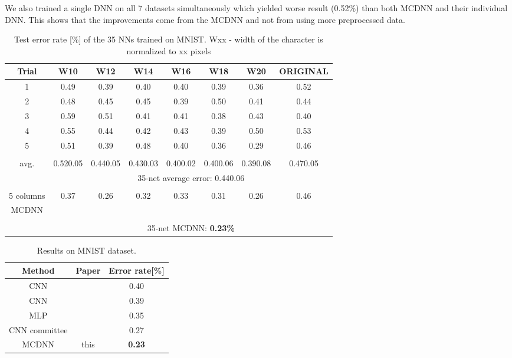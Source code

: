 \documentclass[a4paper]{article}
\begin{document}
We also trained a single DNN on all 7 datasets simultaneously which yielded worse result (0.52\%) than both MCDNN and their individual DNN. This shows that the improvements come from the MCDNN and not from using more preprocessed data.

\begin{table*}[ht!]
	\caption{Test error rate [\%] of the 35 NNs trained on MNIST. Wxx - width of the character is normalized to xx pixels}
	\label{tab:MNISTnets}
	\small
	\centering
  \begin{tabular}{c|ccccccc}
 Trial		&	W10 		& 	W12		&	W14		&	W16		&	W18		&	W20		&	ORIGINAL	\\
   \hline
1 & 0.49 & 0.39 & 0.40 & 0.40 & 0.39 & 0.36 & 0.52\\
2 & 0.48 & 0.45 & 0.45 & 0.39 & 0.50 & 0.41 & 0.44\\
3 & 0.59 & 0.51 & 0.41 & 0.41 & 0.38 & 0.43 & 0.40\\
4 & 0.55 & 0.44 & 0.42 & 0.43 & 0.39 & 0.50 & 0.53\\
5 & 0.51 & 0.39 & 0.48 & 0.40 & 0.36 & 0.29 & 0.46\\
\hline\\
avg. & 0.520.05 & 0.440.05 & 0.430.03 & 0.400.02 & 0.400.06 & 0.390.08 & 0.470.05 \\
&  \multicolumn{7}{c}{35-net average error: 0.440.06}\\
\hline \\
5 columns	& 0.37 & 0.26 & 0.32 & 0.33 & 0.31 & 0.26 & 0.46\\
MCDNN\\
\hline\\
& \multicolumn{7}{c}{35-net MCDNN: {\bf 0.23\%}}\\
  \end{tabular}
\end{table*}

\begin{table}[h]
\caption{Results on MNIST dataset.} 
\label{tab:MNISTresults}
\small
\begin{center}
\begin{tabular}{c|cc}
Method		&	Paper				&	Error rate[\%]\\
\hline
CNN			&	\cite{simard:2003}		&	0.40		\\
CNN			&	\cite{ranzato:2006}		&	0.39		\\
MLP				&	\cite{Ciresan:2010}		&	0.35		\\
CNN committee	&	\cite{Ciresan:2011c}	&	0.27		\\
MCDNN		&	this					&	\bf{0.23}
\end{tabular}
\end{center}
\end{table}
\end{document}
